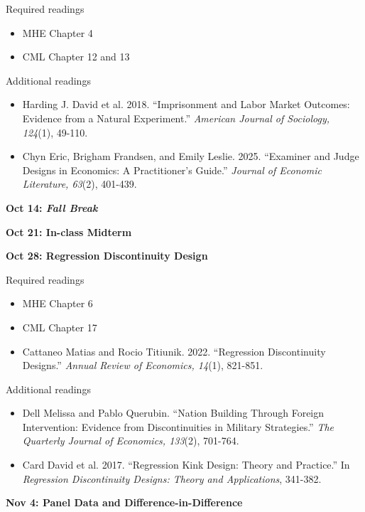 \documentclass[12pt]{article}
\begin{document}
\noindent Required readings
\begin{itemize}
    \item MHE Chapter 4
    \item CML Chapter 12 and 13
\end{itemize}

\noindent Additional readings
\begin{itemize}
    \item Harding J. David et al. 2018. ``Imprisonment and Labor Market Outcomes: Evidence from a Natural Experiment.'' \textit{American Journal of Sociology, 124}(1), 49-110.
    \item Chyn Eric, Brigham Frandsen, and Emily Leslie. 2025. ``Examiner and Judge Designs in Economics: A Practitioner’s Guide.'' \textit{Journal of Economic Literature, 63}(2), 401-439.
\end{itemize}

\vspace{1em} \noindent \textbf{\textcolor{titlecolor}{Oct 14: \textit{Fall Break}}}

\vspace{1em} \noindent \textbf{\textcolor{titlecolor}{Oct 21: In-class Midterm}}

\vspace{1em} \noindent \textbf{\textcolor{titlecolor}{Oct 28: Regression Discontinuity Design}}

\noindent Required readings
\begin{itemize}
    \item MHE Chapter 6
    \item CML Chapter 17
    \item Cattaneo Matias and Rocio Titiunik. 2022. ``Regression Discontinuity Designs.'' \textit{Annual Review of Economics, 14}(1), 821-851.
\end{itemize}

\noindent Additional readings
\begin{itemize}
    \item Dell Melissa and Pablo Querubin. ``Nation Building Through Foreign Intervention: Evidence from Discontinuities in Military Strategies.'' \textit{The Quarterly Journal of Economics, 133}(2), 701-764.
    \item Card David et al. 2017. ``Regression Kink Design: Theory and Practice.'' In \textit{Regression Discontinuity Designs: Theory and Applications}, 341-382.
\end{itemize}

\vspace{1em} \noindent \textbf{\textcolor{titlecolor}{Nov 4: Panel Data and Difference-in-Difference}}
\end{document}
